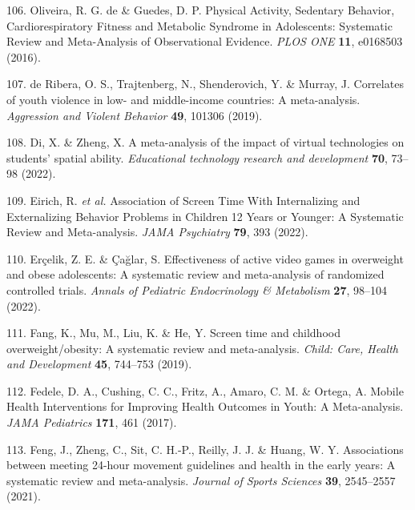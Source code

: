 \documentclass[
  english,
  man]{apa6}
\newenvironment{cslreferences}%
  {}%
  {\par}
\begin{document}
\begin{cslreferences}
\leavevmode\hypertarget{ref-oliveiraPhysicalActivitySedentary2016}{}%
106. Oliveira, R. G. de \& Guedes, D. P. Physical Activity, Sedentary Behavior, Cardiorespiratory Fitness and Metabolic Syndrome in Adolescents: Systematic Review and Meta-Analysis of Observational Evidence. \emph{PLOS ONE} \textbf{11}, e0168503 (2016).

\leavevmode\hypertarget{ref-deriberaCorrelatesYouthViolence2019}{}%
107. de Ribera, O. S., Trajtenberg, N., Shenderovich, Y. \& Murray, J. Correlates of youth violence in low- and middle-income countries: A meta-analysis. \emph{Aggression and Violent Behavior} \textbf{49}, 101306 (2019).

\leavevmode\hypertarget{ref-diMetaanalysisImpactVirtual2022}{}%
108. Di, X. \& Zheng, X. A meta-analysis of the impact of virtual technologies on students' spatial ability. \emph{Educational technology research and development} \textbf{70}, 73--98 (2022).

\leavevmode\hypertarget{ref-eirichAssociationScreenTime2022}{}%
109. Eirich, R. \emph{et al.} Association of Screen Time With Internalizing and Externalizing Behavior Problems in Children 12 Years or Younger: A Systematic Review and Meta-analysis. \emph{JAMA Psychiatry} \textbf{79}, 393 (2022).

\leavevmode\hypertarget{ref-ercelikEffectivenessActiveVideo2022}{}%
110. Erçelik, Z. E. \& Çağlar, S. Effectiveness of active video games in overweight and obese adolescents: A systematic review and meta-analysis of randomized controlled trials. \emph{Annals of Pediatric Endocrinology \& Metabolism} \textbf{27}, 98--104 (2022).

\leavevmode\hypertarget{ref-fangScreenTimeChildhood2019}{}%
111. Fang, K., Mu, M., Liu, K. \& He, Y. Screen time and childhood overweight/obesity: A systematic review and meta-analysis. \emph{Child: Care, Health and Development} \textbf{45}, 744--753 (2019).

\leavevmode\hypertarget{ref-fedeleMobileHealthInterventions2017}{}%
112. Fedele, D. A., Cushing, C. C., Fritz, A., Amaro, C. M. \& Ortega, A. Mobile Health Interventions for Improving Health Outcomes in Youth: A Meta-analysis. \emph{JAMA Pediatrics} \textbf{171}, 461 (2017).

\leavevmode\hypertarget{ref-fengAssociationsMeeting24hour2021}{}%
113. Feng, J., Zheng, C., Sit, C. H.-P., Reilly, J. J. \& Huang, W. Y. Associations between meeting 24-hour movement guidelines and health in the early years: A systematic review and meta-analysis. \emph{Journal of Sports Sciences} \textbf{39}, 2545--2557 (2021).


\end{cslreferences}
\end{document}
